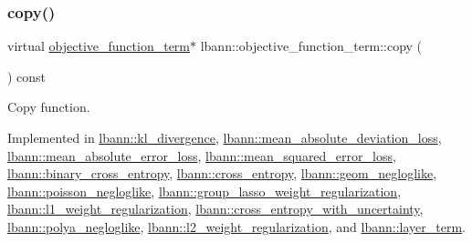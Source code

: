 \mbox{\label{classlbann_1_1objective__function__term_ae98a4ec173a602ad55d1df20dadd4cb9}} 
\subsubsection{\texorpdfstring{copy()}{copy()}}
{\footnotesize\ttfamily virtual \hyperlink{classlbann_1_1objective__function__term}{objective\+\_\+function\+\_\+term}$\ast$ lbann\+::objective\+\_\+function\+\_\+term\+::copy (\begin{DoxyParamCaption}{ }\end{DoxyParamCaption}) const\hspace{0.3cm}{\ttfamily [pure virtual]}}

Copy function. 

Implemented in \hyperlink{classlbann_1_1kl__divergence_aa0265eb9f1cff77d4101137b09f87353}{lbann\+::kl\+\_\+divergence}, \hyperlink{classlbann_1_1mean__absolute__deviation__loss_ad35925ead0532d7893fa9659398ccd45}{lbann\+::mean\+\_\+absolute\+\_\+deviation\+\_\+loss}, \hyperlink{classlbann_1_1mean__absolute__error__loss_aae4bf8c6a5986ae3895b4900f961fd77}{lbann\+::mean\+\_\+absolute\+\_\+error\+\_\+loss}, \hyperlink{classlbann_1_1mean__squared__error__loss_aac723abb01bb19090018b3bddc9b49b0}{lbann\+::mean\+\_\+squared\+\_\+error\+\_\+loss}, \hyperlink{classlbann_1_1binary__cross__entropy_a5183da69553c71cb3fffc765e95c623f}{lbann\+::binary\+\_\+cross\+\_\+entropy}, \hyperlink{classlbann_1_1cross__entropy_a5d709e7cf0a3a260ba8d5c558aebda88}{lbann\+::cross\+\_\+entropy}, \hyperlink{classlbann_1_1geom__negloglike_aa9be2be40a9bbc9599c2e2de3c01872e}{lbann\+::geom\+\_\+negloglike}, \hyperlink{classlbann_1_1poisson__negloglike_a0c24847ce45940d823e27b274fb8b5c4}{lbann\+::poisson\+\_\+negloglike}, \hyperlink{classlbann_1_1group__lasso__weight__regularization_a279b67ef561918425e78cb9b2fa9bb88}{lbann\+::group\+\_\+lasso\+\_\+weight\+\_\+regularization}, \hyperlink{classlbann_1_1l1__weight__regularization_aa5cbb7a878224e152e8e425bb99ea09a}{lbann\+::l1\+\_\+weight\+\_\+regularization}, \hyperlink{classlbann_1_1cross__entropy__with__uncertainty_a3df6ab2f0b06922f860096636242b1bd}{lbann\+::cross\+\_\+entropy\+\_\+with\+\_\+uncertainty}, \hyperlink{classlbann_1_1polya__negloglike_a526b3229a4143359c041f8d88b0a729b}{lbann\+::polya\+\_\+negloglike}, \hyperlink{classlbann_1_1l2__weight__regularization_ac00a969efe6c3fd911a0d69428bb5b95}{lbann\+::l2\+\_\+weight\+\_\+regularization}, and \hyperlink{classlbann_1_1layer__term_a20820da7fd752572579a2dbaaae2ed24}{lbann\+::layer\+\_\+term}.

